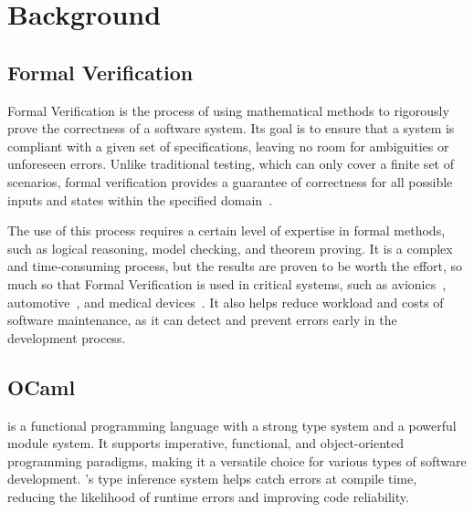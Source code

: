
%

\chapter{Background}
\label{cha:background}

\section{Formal Verification}
\label{sec:formal_verification}

Formal Verification is the process of using mathematical methods to rigorously 
prove the correctness of a software system. Its goal is to ensure that a system 
is compliant with a given set of specifications, leaving no room for ambiguities or 
unforeseen errors. Unlike traditional testing, which can only cover a 
finite set of scenarios, formal verification provides a guarantee of 
correctness for all possible inputs and states within the specified domain~\cite{Brian_Polgreen2025}.

The use of this process requires a certain level of expertise in formal methods, such as 
logical reasoning, model checking, and theorem proving. It is a complex and time-consuming 
process, but the results are proven to be worth the effort, so much so that Formal Verification 
is used in critical systems, such as avionics~\cite{Yin_Yongfeng2010}, automotive~\cite{Rajabli_Nijat2021}, 
and medical devices~\cite{Bezerra_Jonas_Santos2016}. It also helps reduce workload and costs 
of software maintenance, as it can detect and prevent errors early in the development process.

\section{OCaml}
\label{sec:ocaml}

\ocaml is a functional programming language with a strong type system and a powerful
module system. It supports imperative, functional, and object-oriented programming 
paradigms, making it a versatile choice for various types of software development. 
\ocaml's type inference system helps catch errors at compile time, reducing the 
likelihood of runtime errors and improving code reliability.

